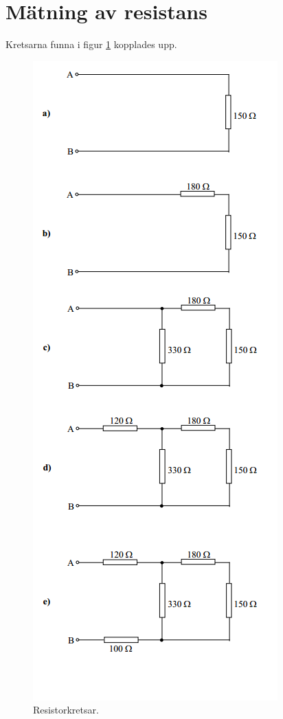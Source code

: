 \documentclass[11pt,a4paper]{article}
\begin{document}
\section{Mätning av resistans}\label{}
Kretsarna funna i figur \ref{fig:4-mm-schem} kopplades upp.

\begin{figure}[htbp]
    \centering
        \includegraphics[scale=0.7]{misc/krets4.png}
    \caption{Resistorkretsar.}
    \label{fig:4-mm-schem}
\end{figure}
\end{document}
